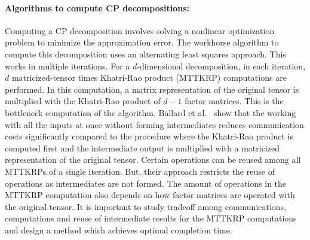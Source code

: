 \documentclass[a4paper,11pt]{article}
\newcommand{\bora}[1]{{\color{magenta} \emph{#1}}}
\newcommand{\sk}[1]{{\color{blue} \emph{#1}}}
\begin{document}

	
	
	\vspace*{-0.35cm}\paragraph{Algorithms to compute CP decompositions:}
	Computing a CP decomposition involves solving a nonlinear optimization problem to minimize the approximation error. The workhorse algorithm to compute this decomposition uses an alternating least squares approach. This works in multiple iterations. For a $d$-dimensional decomposition, in each iteration, $d$ matricized-tensor times Khatri-Rao product (MTTKRP) computations are performed. In this computation, a matrix representation of the original tensor is multiplied with the Khatri-Rao product of $d-1$ factor matrices. This is the bottleneck computation of the algorithm. 
	Ballard et al.~\cite{BNR-IPDPS-2018} show that the working
	with all the inputs at once without forming intermediates reduces communication costs significantly compared to the procedure where the Khatri-Rao product is computed first and the intermediate output is multiplied with a matricized representation of the original tensor. Certain operations can be reused among all MTTKRPs of a single iteration. But, their approach restricts the reuse of operations as intermediates are not formed. The amount of operations in the MTTKRP computation also depends on how factor matrices are operated with the original tensor.
	It is important to study tradeoff among communications, computations and reuse of intermediate results for the MTTKRP computations and design a method which achieves optimal completion time.
	
	
\end{document}
